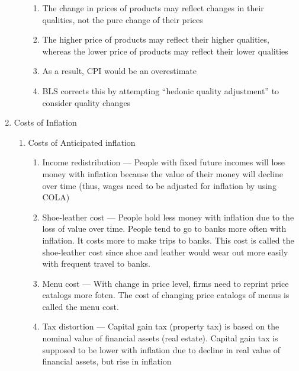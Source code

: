\documentclass[12pt]{article}
\begin{document}
\begin{enumerate}
\begin{enumerate}
\begin{enumerate}
              \item The change in prices of products may reflect changes in their qualities, not the pure change of their prices

              \item The higher price of products may reflect their higher qualities, whereas the lower price of products may reflect their lower qualities

              \item As a result, CPI would be an overestimate

              \item BLS corrects this by attempting “hedonic quality adjustment” to consider quality changes

            \end{enumerate}

        \end{enumerate}

      \item Costs of Inflation

        \begin{enumerate}

          \item Costs of Anticipated inflation

            \begin{enumerate}

              \item Income redistribution — People with fixed future incomes will lose money with inflation because the value of their money will decline over time (thus, wages need to be adjusted for inflation by using COLA)

              \item Shoe-leather cost — People hold less money with inflation due to the loss of value over time. People tend to go to banks more often with inflation. It costs more to make trips to banks. This cost is called the shoe-leather cost since shoe and leather would wear out more easily with frequent travel to banks.

              \item Menu cost — With change in price level, firms need to reprint price catalogs more foten. The cost of changing price catalogs of menus is called the menu cost.

              \item Tax distortion — Capital gain tax (property tax) is based on the nominal value of financial assets (real estate). Capital gain tax is supposed to be lower with inflation due to decline in real value of financial assets, but rise in inflation


\end{enumerate}
\end{enumerate}
\end{enumerate}
\end{document}
